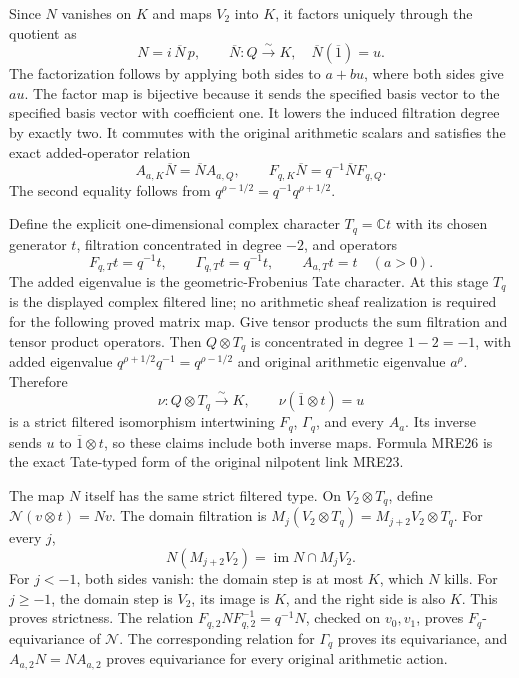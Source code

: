 \documentclass[11pt,a4paper]{article}
\begin{document}
Since \(N\) vanishes on \(K\) and maps \(V_2\) into \(K\), it factors
uniquely through the quotient as
\[
 N=i\,\overline N\,p,
 \qquad
 \overline N:Q\xrightarrow{\sim}K,
 \quad\overline N(\overline{1})=u.
 \tag{MRE23}
\]
The factorization follows by applying both sides to \(a+bu\), where
both sides give \(au\). The factor map is bijective because it sends
the specified basis vector to the specified basis vector with
coefficient one. It lowers the induced filtration degree by exactly two.
It commutes with the original arithmetic scalars and satisfies the exact
added-operator relation
\[
 A_{a,K}\overline N=\overline N A_{a,Q},\qquad
 F_{q,K}\overline N=q^{-1}\overline N F_{q,Q}.
 \tag{MRE24}
\]
The second equality follows from
\(q^{\rho-1/2}=q^{-1}q^{\rho+1/2}\).

Define the explicit one-dimensional complex character \(T_q=\mathbb C t\)
with its chosen generator \(t\), filtration concentrated in degree
\(-2\), and operators
\[
 F_{q,T}t=q^{-1}t,\qquad
 \Gamma_{q,T}t=q^{-1}t,\qquad
 A_{a,T}t=t\quad(a>0).
 \tag{MRE25}
\]
The added eigenvalue is the geometric-Frobenius Tate character. At this
stage \(T_q\) is the displayed complex filtered line; no arithmetic
sheaf realization is required for the following proved matrix map.
Give tensor products the sum filtration and tensor product operators.
Then \(Q\otimes T_q\) is concentrated in degree \(1-2=-1\), with added
eigenvalue \(q^{\rho+1/2}q^{-1}=q^{\rho-1/2}\) and original arithmetic
eigenvalue \(a^\rho\). Therefore
\[
 \nu:Q\otimes T_q\xrightarrow{\sim}K,
 \qquad \nu(\overline{1}\otimes t)=u
 \tag{MRE26}
\]
is a strict filtered isomorphism intertwining \(F_q\), \(\Gamma_q\), and
every \(A_a\). Its inverse sends \(u\) to \(\overline{1}\otimes t\),
so these claims include both inverse maps. Formula MRE26 is the exact
Tate-typed form of the original nilpotent link MRE23.

The map \(N\) itself has the same strict filtered type. On
\(V_2\otimes T_q\), define \(\mathcal N(v\otimes t)=Nv\).
The domain filtration is \(M_j(V_2\otimes T_q)=M_{j+2}V_2\otimes T_q\).
For every \(j\),
\[
 N(M_{j+2}V_2)=\operatorname{im}N\cap M_jV_2.
 \tag{MRE27}
\]
For \(j<-1\), both sides vanish: the domain step is at most \(K\),
which \(N\) kills. For \(j\geq-1\), the domain step is \(V_2\), its
image is \(K\), and the right side is also \(K\). This proves strictness.
The relation \(F_{q,2}NF_{q,2}^{-1}=q^{-1}N\), checked on \(v_0,v_1\),
proves \(F_q\)-equivariance of \(\mathcal N\). The corresponding relation
for \(\Gamma_q\) proves its equivariance, and \(A_{a,2}N=NA_{a,2}\)
proves equivariance for every original arithmetic action.
\end{document}
